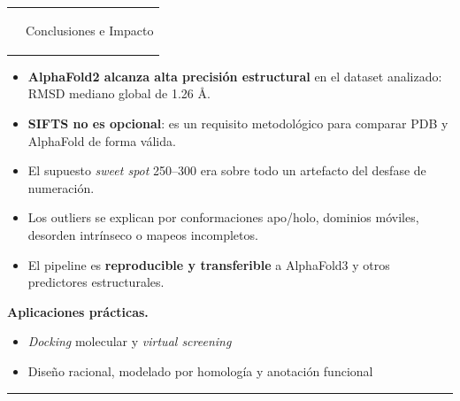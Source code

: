 \documentclass[14pt]{extarticle}
\makeatletter
\newcommand{\Ang}{\AA}
\newcommand{\paneltitle}[1]{%
  \par\medskip
  \noindent
  \begin{tabular}{@{}p{0.45cm}@{\hspace{0.35em}}p{\dimexpr\linewidth-0.8cm\relax}@{}}
    \cellcolor{gold}\rule{0pt}{0.82cm} &
    \cellcolor{navy}\color{white}\bfseries\Large\rule{0pt}{0.82cm}\hspace{0.35em}#1
  \end{tabular}
  \par\smallskip
}
\newcommand{\panelend}{%
  \par\smallskip
  {\color{linegray}\rule{\linewidth}{0.8pt}}
  \par\medskip
}
\makeatother
\begin{document}
\begin{minipage}[t]{0.485\textwidth}
\paneltitle{Conclusiones e Impacto}
\begin{itemize}
  \item \textbf{AlphaFold2 alcanza alta precisión estructural} en el dataset analizado: RMSD mediano global de 1.26 \Ang.
  \item \textbf{SIFTS no es opcional}: es un requisito metodológico para comparar PDB y AlphaFold de forma válida.
  \item El supuesto \textit{sweet spot} 250--300 era sobre todo un artefacto del desfase de numeración.
  \item Los outliers se explican por conformaciones apo/holo, dominios móviles, desorden intrínseco o mapeos incompletos.
  \item El pipeline es \textbf{reproducible y transferible} a AlphaFold3 y otros predictores estructurales.
\end{itemize}

\textbf{Aplicaciones prácticas.}
\begin{itemize}
  \item \textit{Docking} molecular y \textit{virtual screening}
  \item Diseño racional, modelado por homología y anotación funcional
\end{itemize}
\panelend

\end{minipage}

\vfill

\noindent{}
\end{document}
